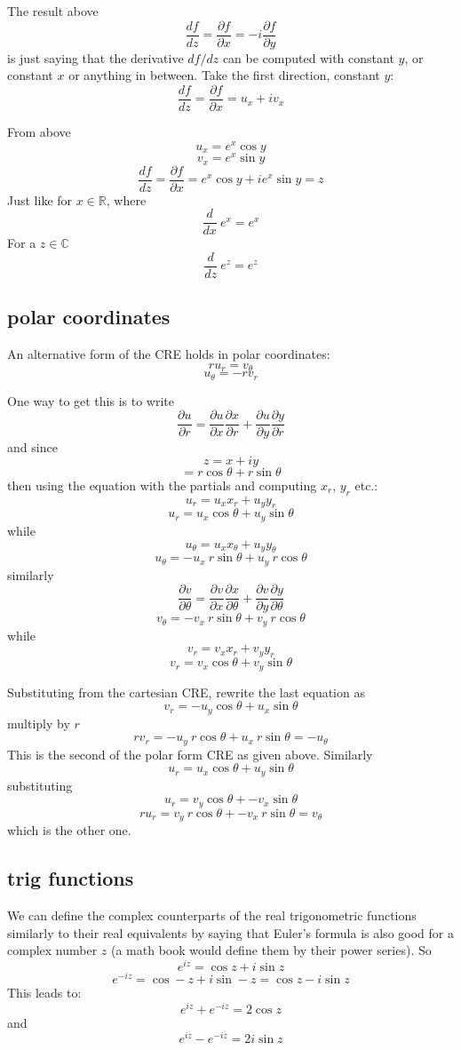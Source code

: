 \documentclass[11pt, oneside]{article}   	%
\begin{document}
The result above
\[ \frac{df}{dz} = \frac{\partial f}{\partial x} = - i \frac{\partial f}{\partial y} \]
is just saying that the derivative $df/dz$ can be computed with constant $y$, or constant $x$ or anything in between.  Take the first direction, constant $y$:
\[ \frac{df}{dz} = \frac{\partial f}{\partial x} = u_x + i v_x \]

From above
\[ u_x = e^x \cos y \]
\[ v_x = e^x \sin y \]
\[ \frac{df}{dz} = \frac{\partial f}{\partial x} =  e^x \cos y + i  e^x \sin y = z \]
Just like for $x \in \mathbb{R}$, where
\[ \frac{d}{dx} \ e^x = e^x \]
For a $z \in \mathbb{C}$
\[ \frac{d}{dz} \ e^z = e^z \]

\subsection*{polar coordinates}

An alternative form of the CRE holds in polar coordinates:
\[ r u_r = v_{\theta} \]
\[ u_{\theta} = - r v_r \]

One way to get this is to write
\[ \frac{\partial u}{\partial r} =  \frac{\partial u}{\partial x}\frac{\partial x}{\partial r} + \frac{\partial u}{\partial y}\frac{\partial y}{\partial r} \]
and since 
\[ z = x + iy \]
\[= r \cos \theta + r \sin \theta \]
then using the equation with the partials and computing $x_r$, $y_r$ etc.:
\[ u_r = u_x x_r + u_y y_r \]
\[ u_r = u_x \cos \theta + u_y \sin \theta \]
while
\[ u_{\theta} = u_x x_{\theta} + u_y y_{\theta} \]
\[ u_{\theta} = -u_x \ r \sin \theta + u_y \  r \cos \theta \]
similarly
\[ \frac{\partial v}{\partial \theta} =  \frac{\partial v}{\partial x}\frac{\partial x}{\partial \theta} + \frac{\partial v}{\partial y}\frac{\partial y}{\partial \theta} \]
\[ v_{\theta} = -v_x \ r \sin \theta + v_y \ r \cos \theta \]
while
\[ v_r = v_x x_r + v_y y_r \]
\[ v_r = v_x \cos \theta + v_y \sin \theta \]

Substituting from the cartesian CRE, rewrite the last equation as
\[ v_r = -u_y \cos \theta + u_x \sin \theta \]
multiply by $r$
\[ r v_r = -u_y \ r \cos \theta + u_x \ r \sin \theta = - u_\theta  \]
This is the second of the polar form CRE as given above. Similarly
\[ u_r = u_x \cos \theta + u_y \sin \theta \]
substituting
\[ u_r = v_y \cos \theta + - v_x \sin \theta \]
\[ r u_r = v_y \ r \cos \theta + - v_x \ r \sin \theta = v_{\theta} \]
which is the other one.

\subsection*{trig functions}
We can define the complex counterparts of the real trigonometric functions similarly to their real equivalents by saying that Euler's formula is also good for a complex number $z$ (a math book would define them by their power series).  So
\[ e^{iz} = \cos z + i \sin z \]
\[ e^{-iz} = \cos -z + i \sin -z = \cos z - i \sin z \]
This leads to:
\[ e^{iz} + e^{-iz} = 2 \cos z \]
and
\[ e^{iz} - e^{-iz} = 2i \sin z \]
\end{document}
